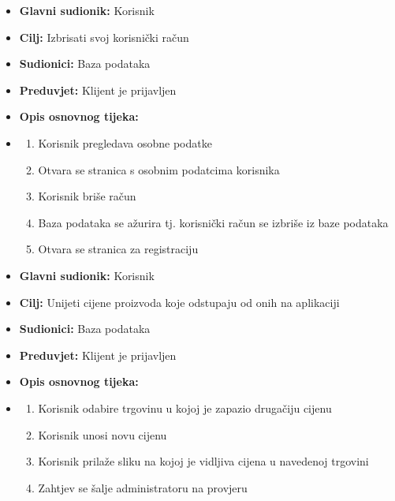                         \noindent {}
					\begin{itemize}
	
						\item \textbf{Glavni sudionik: }Korisnik
						\item  \textbf{Cilj:} Izbrisati svoj korisnički račun
						\item  \textbf{Sudionici:} Baza podataka
						\item  \textbf{Preduvjet:} Klijent je prijavljen
						\item  \textbf{Opis osnovnog tijeka:}
						
						\item[] \begin{enumerate}
							\item Korisnik pregledava osobne podatke
                                \item Otvara se stranica s osobnim podatcima korisnika
                                \item Korisnik briše račun
                                \item Baza podataka se ažurira tj. korisnički račun se izbriše iz baze podataka
                                \item Otvara se stranica za registraciju\\
						\end{enumerate}
						
					\end{itemize}

                        \noindent {}
					\begin{itemize}
	
						\item \textbf{Glavni sudionik: }Korisnik
						\item  \textbf{Cilj:} Unijeti cijene proizvoda koje odstupaju od onih na aplikaciji
						\item  \textbf{Sudionici:} Baza podataka
						\item  \textbf{Preduvjet:} Klijent je prijavljen
						\item  \textbf{Opis osnovnog tijeka:}
						
						\item[] \begin{enumerate}
							\item Korisnik odabire trgovinu u kojoj je zapazio drugačiju cijenu
                                \item Korisnik unosi novu cijenu
                                \item Korisnik prilaže sliku na kojoj je vidljiva cijena u navedenoj trgovini
                                \item Zahtjev se šalje administratoru na provjeru\\
						\end{enumerate}
						
					\end{itemize}


